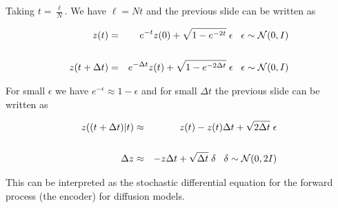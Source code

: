 {

\medskip
Taking $t = \frac{\ell}{N}$. We have $\ell = Nt$ and the previous slide can be written as

\begin{eqnarray*}
  z(t) & = & e^{-t} z(0) + \sqrt{1 - e^{-2t}}\;\epsilon \;\;\;\epsilon \sim {\cal N}(0,I) \\
  \\
  z(t+\Delta t) & = & e^{- \Delta t} z(t) + \sqrt{1 - e^{-2\Delta t}}\;\epsilon \;\;\;\epsilon \sim {\cal N}(0,I)
\end{eqnarray*}

For small $\epsilon$ we have $e^{-\epsilon} \approx 1-\epsilon$ and for small $\Delta t$ the previous slide can be written as

\vfill
  \begin{eqnarray*}
    z((t + \Delta t)|t) & \approx & z(t) - z(t)\Delta t + \sqrt{2\Delta t} \;\epsilon \\
    \\
    \Delta z & \approx & -z \Delta t + \sqrt{\Delta t} \;\delta \;\;\;\delta \sim {\cal N}(0,2I)
    \end{eqnarray*}    

\vfill
This can be interpreted as the stochastic differential equation for the forward process (the encoder) for diffusion models.

}

